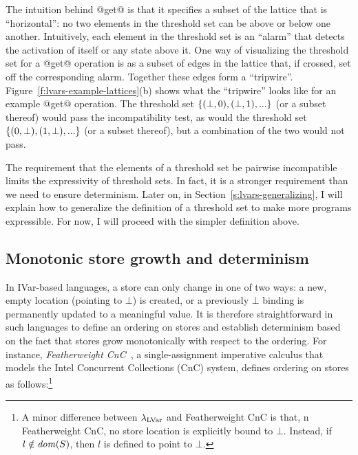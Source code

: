 The intuition behind @get@ is that it specifies a subset of the
lattice that is ``horizontal'': no two elements in the threshold set
can be above or below one another.  Intuitively, each element in the
threshold set is an ``alarm'' that detects the activation of itself or
any state above it.  One way of visualizing the threshold set for a
@get@ operation is as a subset of edges in the lattice that, if
crossed, set off the corresponding alarm.  Together these edges form a
``tripwire''.  Figure~\ref{f:lvars-example-lattices}(b) shows what the
``tripwire'' looks like for an example @get@ operation.  The
threshold set $\lbrace (\bot, 0), (\bot, 1), ... \rbrace$ (or a subset
thereof) would pass the incompatibility test, as would the threshold
set $\lbrace (0, \bot), (1, \bot), ... \rbrace$ (or a subset thereof), but
a combination of the two would not pass.

The requirement that the elements of a threshold set be pairwise
incompatible limits the expressivity of threshold sets.  In fact, it
is a stronger requirement than we need to ensure determinism.  Later
on, in Section~\ref{s:lvars-generalizing}, I will explain how to
generalize the definition of a threshold set to make more programs
expressible.  For now, I will proceed with the simpler definition
above.

\subsection{Monotonic store growth and determinism}\label{subsection:lvars-monotonic-store-growth}

In IVar-based languages, a store can only change in one of two ways: a
new, empty location (pointing to $\bot$) is created, or a previously
$\bot$ binding is permanently updated to a meaningful value.  It is
therefore straightforward in such languages to define an ordering on
stores and establish determinism based on the fact that stores grow
monotonically with respect to the ordering. For instance,
\emph{Featherweight CnC}~\cite{CnC}, a single-assignment imperative
calculus that models the Intel Concurrent Collections (CnC) system,
defines ordering on stores as follows:\footnote{A minor difference
  between $\lambda_{\textrm{LVar}}$ and Featherweight CnC is that, n Featherweight
  CnC, no store location is explicitly bound to $\bot$.  Instead, if
  $l \notin \mathit{dom}(S)$, then $l$ is defined to point to $\bot$.}

\LVarsDefLeqStoreCnC

